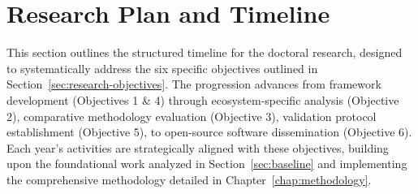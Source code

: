 
\cleardoublepage
\label{chap:evaluation}

\section{Research Plan and Timeline}

This section outlines the structured timeline for the doctoral research, designed to systematically address the six specific objectives outlined in Section~\ref{sec:research-objectives}. The progression advances from framework development (Objectives 1 \& 4) through ecosystem-specific analysis (Objective 2), comparative methodology evaluation (Objective 3), validation protocol establishment (Objective 5), to open-source software dissemination (Objective 6). Each year's activities are strategically aligned with these objectives, building upon the foundational work analyzed in Section~\ref{sec:baseline} and implementing the comprehensive methodology detailed in Chapter~\ref{chap:methodology}.

